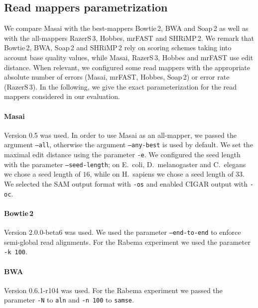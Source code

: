 \subsection{Read mappers parametrization}

We compare Masai with the best-mappers Bowtie\,2, BWA and Soap\,2 as well as with the all-mappers RazerS\,3, Hobbes, mrFAST and SHRiMP\,2.
We remark that Bowtie\,2, BWA, Soap\,2 and SHRiMP\,2 rely on scoring schemes taking into account base quality values, while Masai, RazerS\,3, Hobbes and mrFAST use edit distance.
When relevant, we configured some read mappers with the appropriate absolute number of errors (Masai, mrFAST, Hobbes, Soap\,2) or error rate (RazerS\,3).
In the following, we give the exact parameterization for the read mappers considered in our evaluation.

\paragraph{Masai}
Version 0.5 was used.
In order to use Masai as an all-mapper, we passed the argument \texttt{--all}, otherwise the argument \texttt{--any-best} is used by default.
We set the maximal edit distance using the parameter \texttt{-e}.
We configured the seed length with the parameter \texttt{--seed-length}; on E.~coli, D.~melanogaster and C.~elegans we chose a seed length of $16$, while on H.~sapiens we chose a seed length of $33$.
We selected the SAM output format with \texttt{-os} and enabled CIGAR output with \texttt{-oc}.

\paragraph{Bowtie\,2}
Version 2.0.0-beta6 was used.
We used the parameter \texttt{--end-to-end} to enforce semi-global read alignments.
For the Rabema experiment we used the parameter \texttt{-k 100}.

\paragraph{BWA}
Version 0.6.1-r104 was used.
For the Rabema experiment we passed the parameter \texttt{-N} to \texttt{aln} and \texttt{-n 100} to \texttt{samse}.

